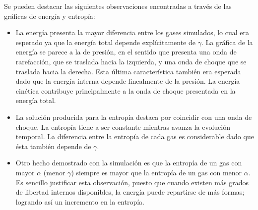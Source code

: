 Se pueden destacar las siguientes observaciones encontradas a través de las gráficas de energía y entropía:
\begin{itemize}
	\item La energía presenta la mayor diferencia entre los gases simulados, lo cual era esperado ya que la energía total depende explícitamente de $\gamma$. La gráfica de la energía se parece a la de presión, en el sentido que presenta una onda de rarefacción, que se traslada hacia la izquierda, y una onda de choque que se traslada hacia la derecha. Esta última característica también era esperada dado que la energía interna depende linealmente de la presión. La energía cinética contribuye principalmente a la onda de choque presentada en la energía total.
	\item La solución producida para la entropía destaca por coincidir con una onda de choque. La entropía tiene a ser constante mientras avanza la evolución temporal. La diferencia entre la entropía de cada gas es considerable dado que ésta también depende de $\gamma$.
	\item Otro hecho demostrado con la simulación es que la entropía de un gas con mayor $\alpha$ (menor $\gamma$) siempre es mayor que la entropía de un gas con  menor $\alpha$. Es sencillo justificar esta observación, puesto que cuando existen más grados de libertad internos disponibles, la energía puede repartirse de más formas; logrando así un incremento en la entropía. 
\end{itemize}